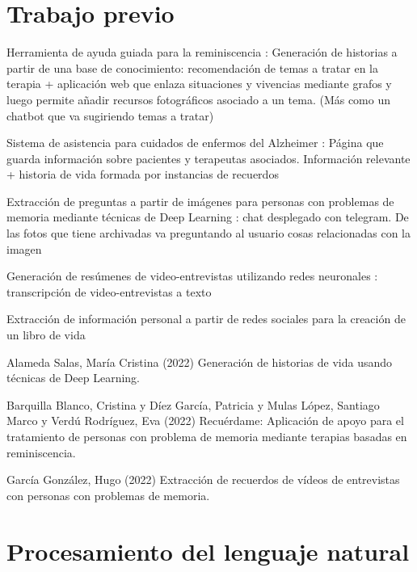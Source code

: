 \section{Trabajo previo}
Herramienta de ayuda guiada para la reminiscencia \citep{reminiscencia} : Generación de historias a partir de una base de conocimiento: recomendación de temas a tratar en la terapia + aplicación web que enlaza situaciones y vivencias mediante grafos y luego permite añadir recursos fotográficos asociado a un tema. (Más como un chatbot que va sugiriendo temas a tratar)

Sistema de asistencia para cuidados de enfermos del Alzheimer \citep{asistencia} : Página que guarda información sobre pacientes y terapeutas asociados. Información relevante + historia de vida formada por instancias de recuerdos

Extracción de preguntas a partir de imágenes para personas con problemas de memoria mediante técnicas de Deep Learning \citep{preguntas} : chat desplegado con telegram. De las fotos que tiene archivadas va preguntando al usuario cosas relacionadas con la imagen

Generación de resúmenes de video-entrevistas utilizando redes neuronales \citep{resumen} : transcripción de video-entrevistas a texto

Extracción de información personal a partir de redes sociales para la creación de un libro de vida \citep{rrss}

Alameda Salas, María Cristina (2022) Generación de historias de vida usando técnicas de Deep Learning.

Barquilla Blanco, Cristina y Díez García, Patricia y Mulas López, Santiago Marco y Verdú Rodríguez, Eva (2022) Recuérdame: Aplicación de apoyo para el tratamiento de personas con problema de memoria mediante terapias basadas en reminiscencia. 

García González, Hugo (2022) Extracción de recuerdos de vídeos de entrevistas con personas con problemas de memoria. 

\section{Procesamiento del lenguaje natural}

